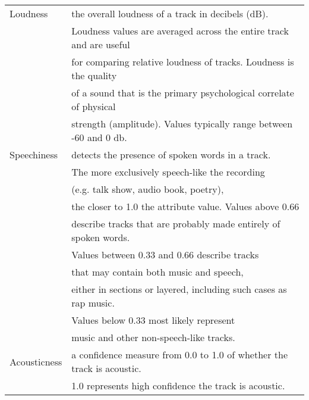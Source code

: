 \documentclass[12pt]{article}
\theoremstyle{remark}
\begin{document}
\begin{table}
\begin{tabular}{l|l}
Loudness & the overall loudness of a track in decibels (dB).\\
& Loudness values are averaged across the entire track and are useful \\
& for comparing relative loudness of tracks. Loudness is the quality \\
& of a sound that is the primary psychological correlate of physical \\
& strength (amplitude). Values typically range between -60 and 0 db.\\
Speechiness & detects the presence of spoken words in a track.\\
& The more exclusively speech-like the recording\\
 &(e.g. talk show, audio book, poetry), \\
 &the closer to 1.0 the attribute value. Values above 0.66\\
 &  describe tracks that are probably made entirely of spoken words.\\
 & Values between 0.33 and 0.66 describe tracks \\
 & that may contain both music and speech, \\
 & either in sections or layered, including such cases as rap music. \\
 & Values below 0.33 most likely represent \\
 & music and other non-speech-like tracks. \\
Acousticness & a confidence measure from 0.0 to 1.0 of whether the track is acoustic.\\
& 1.0 represents high confidence the track is acoustic.\\
	\hline
	\end{tabular}
\end{table}
\end{document}
